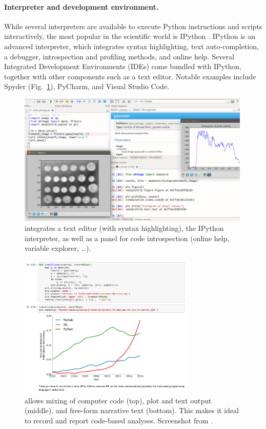 \documentclass[twocolumn]{bmcart}%
\begin{document}
\paragraph{Interpreter and development environment.}

While several interpreters are available to execute Python instructions
and scripts interactively, the most popular in the scientific world is
IPython \citep{Perez2007, Rossant2015}. IPython is an advanced
interpreter, which integrates syntax highlighting, text auto-completion,
a debugger, introspection and profiling methods, and online help. Several
Integrated Development Environments (IDEs) come bundled with IPython,
together with other components such as a text editor. Notable examples
include Spyder (Fig.~\ref{fig:spyder}), PyCharm, and Visual Studio Code.

\begin{figure}[ht!]
    \centerline{\includegraphics[width=0.99\textwidth]{spyder_process}}
    \caption{ integrates a text editor (with
	syntax highlighting), the IPython interpreter, as well as a panel
	for code introspection (online help, variable explorer, \dots).
 \label{fig:spyder}}
\end{figure}

\begin{figure}[ht!]
    \centerline{\includegraphics[width=0.75\textwidth]{jupyter_example}}
    \caption{ allows mixing of computer code (top),
             plot and text output (middle), and free-form narrative text (bottom).
             This makes it ideal to record and report code-based analyses.
             Screenshot from \cite{NunezIglesias2016}.
 \label{fig:jupyter}}
\end{figure}
\end{document}
